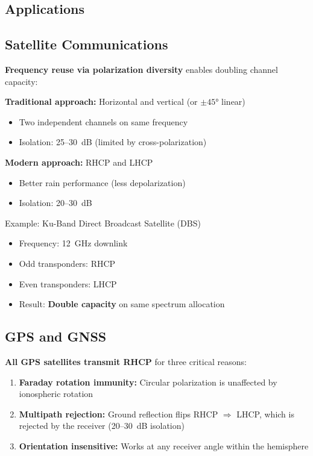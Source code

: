 \begin{center}
\section{Applications}

\subsection{Satellite Communications}

\textbf{Frequency reuse via polarization diversity} enables doubling channel capacity:

\textbf{Traditional approach:} Horizontal and vertical (or $\pm 45°$ linear)
\begin{itemize}
\item Two independent channels on same frequency
\item Isolation: 25--30~dB (limited by cross-polarization)
\end{itemize}

\textbf{Modern approach:} RHCP and LHCP
\begin{itemize}
\item Better rain performance (less depolarization)
\item Isolation: 20--30~dB
\end{itemize}

\begin{calloutbox}{Example: Ku-Band Direct Broadcast Satellite (DBS)}
\begin{itemize}
\item Frequency: 12~GHz downlink
\item Odd transponders: RHCP
\item Even transponders: LHCP
\item Result: \textbf{Double capacity} on same spectrum allocation
\end{itemize}
\end{calloutbox}

\subsection{GPS and GNSS}

\textbf{All GPS satellites transmit RHCP} for three critical reasons:

\begin{enumerate}
\item \textbf{Faraday rotation immunity:} Circular polarization is unaffected by ionospheric rotation
\item \textbf{Multipath rejection:} Ground reflection flips RHCP $\Rightarrow$ LHCP, which is rejected by the receiver (20--30~dB isolation)
\item \textbf{Orientation insensitive:} Works at any receiver angle within the hemisphere
\end{enumerate}


\end{center}
